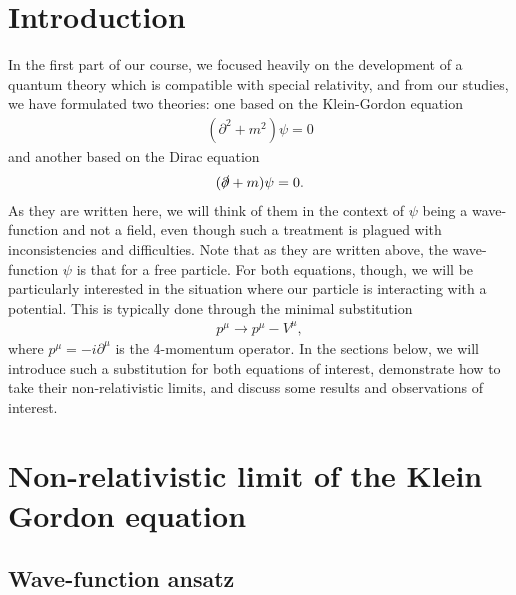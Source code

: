 
\def\HWnum{Midterm Notes}
\def\duedate{November 6, 2024}



\section{Introduction}
\label{sec:introduction}

In the first part of our course, we focused heavily on the development of a quantum theory which is compatible with special relativity, and from our studies, we have formulated two theories: one based on the Klein-Gordon equation
\begin{align}
    ( \partial^2 + m^2 ) \psi = 0
\end{align}
and another based on the Dirac equation
\begin{align}
    ( \slashed{\partial} + m ) \psi = 0
.\end{align}
As they are written here, we will think of them in the context of $\psi$ being a wave-function and not a field, even though such a treatment is plagued with inconsistencies and difficulties.
Note that as they are written above, the wave-function $\psi$ is that for a free particle.
For both equations, though, we will be particularly interested in the situation where our particle is interacting with a potential.
This is typically done through the minimal substitution
\begin{align}
    p^{\mu} \rightarrow p^{\mu} - V^{\mu}
,\end{align}
where $p^{\mu} = - i \partial^{\mu}$ is the 4-momentum operator.
In the sections below, we will introduce such a substitution for both equations of interest, demonstrate how to take their non-relativistic limits, and discuss some results and observations of interest.



\section{Non-relativistic limit of the Klein Gordon equation}
\label{sec:nr-limit-of-the-kg-equation}

\subsection{Wave-function ansatz}

